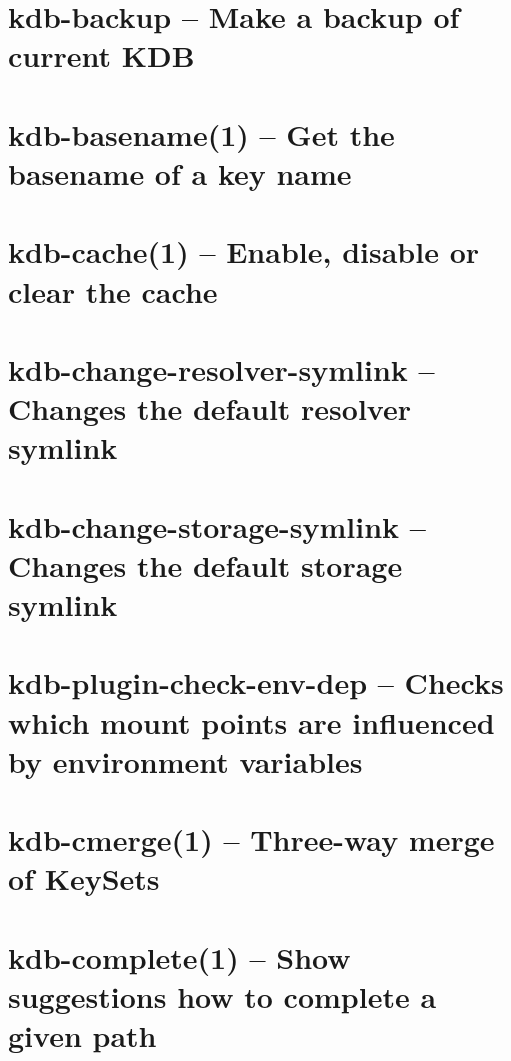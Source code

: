 \let\mypdfximage\pdfximage\def\pdfximage{\immediate\mypdfximage}\documentclass[twoside]{book}
\newcommand{\+}{\discretionary{\mbox{\scriptsize$\hookleftarrow$}}{}{}}
\begin{document}
\chapter{kdb-\/backup -- Make a backup of current KDB}
\label{doc_help_kdb-backup_md}

\chapter{kdb-\/basename(1) -- Get the basename of a key name}
\label{doc_help_kdb-basename_md}

\chapter{kdb-\/cache(1) -- Enable, disable or clear the cache}
\label{doc_help_kdb-cache_md}

\chapter{kdb-\/change-\/resolver-\/symlink -- Changes the default resolver symlink}
\label{doc_help_kdb-change-resolver-symlink_md}

\chapter{kdb-\/change-\/storage-\/symlink -- Changes the default storage symlink}
\label{doc_help_kdb-change-storage-symlink_md}

\chapter{kdb-\/plugin-\/check-\/env-\/dep -- Checks which mount points are influenced by environment variables}
\label{doc_help_kdb-check-env-dep_md}

\chapter{kdb-\/cmerge(1) -- Three-\/way merge of Key\+Sets}
\label{doc_help_kdb-cmerge_md}

\chapter{kdb-\/complete(1) -- Show suggestions how to complete a given path}
\label{doc_help_kdb-complete_md}

\end{document}
